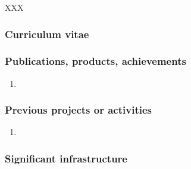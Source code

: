 \begin{sitedescription}{XXX}

%

\subsubsection*{Curriculum vitae}


%
%
%


\subsubsection*{Publications, products, achievements}

\begin{enumerate}
\item {}
\end{enumerate}

\subsubsection*{Previous projects or activities}

\begin{enumerate}
\item {}
\end{enumerate}

\subsubsection*{Significant infrastructure}

\end{sitedescription}
